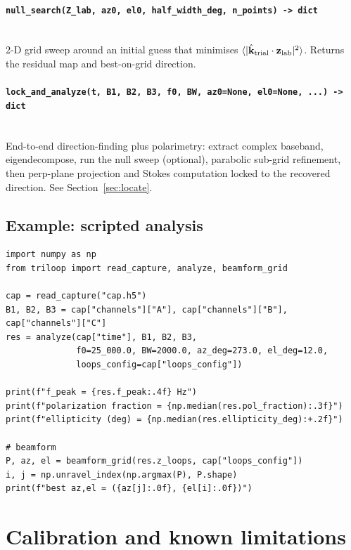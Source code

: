 \documentclass[11pt]{article}
\begin{document}
\paragraph{\texttt{null\_search(Z\_lab, az0, el0, half\_width\_deg, n\_points) -> dict}}\quad\\
2-D grid sweep around an initial guess that minimises
$\langle |\hat{\mathbf k}_{\rm trial}\cdot\mathbf z_{\rm lab}|^2\rangle$.
Returns the residual map and best-on-grid direction.

\paragraph{\texttt{lock\_and\_analyze(t, B1, B2, B3, f0, BW, az0=None, el0=None, ...) -> dict}}\quad\\
End-to-end direction-finding plus polarimetry: extract complex
baseband, eigendecompose, run the null sweep (optional), parabolic
sub-grid refinement, then perp-plane projection and Stokes
computation locked to the recovered direction.  See
Section~\ref{sec:locate}.

\subsection{Example: scripted analysis}

\begin{lstlisting}[style=py]
import numpy as np
from triloop import read_capture, analyze, beamform_grid

cap = read_capture("cap.h5")
B1, B2, B3 = cap["channels"]["A"], cap["channels"]["B"], cap["channels"]["C"]
res = analyze(cap["time"], B1, B2, B3,
              f0=25_000.0, BW=2000.0, az_deg=273.0, el_deg=12.0,
              loops_config=cap["loops_config"])

print(f"f_peak = {res.f_peak:.4f} Hz")
print(f"polarization fraction = {np.median(res.pol_fraction):.3f}")
print(f"ellipticity (deg) = {np.median(res.ellipticity_deg):+.2f}")

# beamform
P, az, el = beamform_grid(res.z_loops, cap["loops_config"])
i, j = np.unravel_index(np.argmax(P), P.shape)
print(f"best az,el = ({az[j]:.0f}, {el[i]:.0f})")
\end{lstlisting}

\section{Calibration and known limitations}
\end{document}
